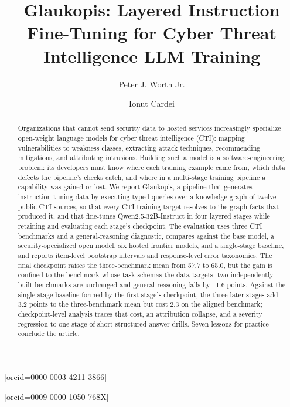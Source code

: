 \documentclass[a4paper,fleqn]{cas-dc}
\begin{document}
\let\WriteBookmarks\relax
\def\floatpagepagefraction{1}
\def\textpagefraction{.001}


\title[mode=title]{Glaukopis: Layered Instruction Fine-Tuning for Cyber Threat Intelligence LLM Training}

\author[1,2]{Peter J. Worth Jr.}[orcid=0000-0003-4211-3866]
\cormark[1]

\author[1,2]{Ionut Cardei}[orcid=0009-0000-1050-768X]



\begin{abstract}
Organizations that cannot send security data to hosted services increasingly specialize open-weight language models for cyber threat intelligence (CTI): mapping vulnerabilities to weakness classes, extracting attack techniques, recommending mitigations, and attributing intrusions. Building such a model is a software-engineering problem: its developers must know where each training example came from, which data defects the pipeline's checks catch, and where in a multi-stage training pipeline a capability was gained or lost. We report Glaukopis, a pipeline that generates instruction-tuning data by executing typed queries over a knowledge graph of twelve public CTI sources, so that every CTI training target resolves to the graph facts that produced it, and that fine-tunes Qwen2.5-32B-Instruct in four layered stages while retaining and evaluating each stage's checkpoint. The evaluation uses three CTI benchmarks and a general-reasoning diagnostic, compares against the base model, a security-specialized open model, six hosted frontier models, and a single-stage baseline, and reports item-level bootstrap intervals and response-level error taxonomies. The final checkpoint raises the three-benchmark mean from 57.7 to 65.0, but the gain is confined to the benchmark whose task schemas the data targets; two independently built benchmarks are unchanged and general reasoning falls by 11.6 points. Against the single-stage baseline formed by the first stage's checkpoint, the three later stages add 3.2 points to the three-benchmark mean but cost 2.3 on the aligned benchmark; checkpoint-level analysis traces that cost, an attribution collapse, and a severity regression to one stage of short structured-answer drills. Seven lessons for practice conclude the article.
\end{abstract}
\end{document}
